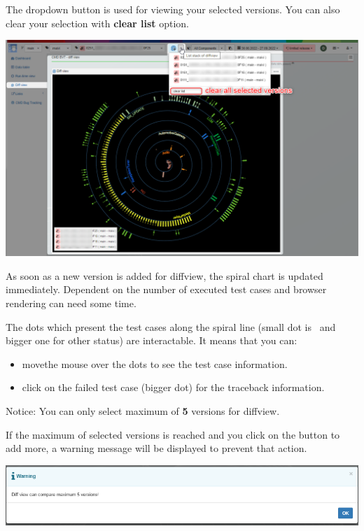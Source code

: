 The dropdown button is used for viewing your selected versions.
You can also clear your selection with \textbf{clear list} option.

\includegraphics[width=1\linewidth]{./pictures/diffview/selected_version.png}

As soon as a new version is added for diffview, the spiral chart is updated
immediately. Dependent on the number of executed test cases and browser
rendering can need some time.

The dots which present the test cases along the spiral line (small dot is
\passed\ and bigger one for other status) are interactable.
It means that you can:
\begin{itemize}
   \item movethe mouse over the dots to see the test case information.
   \item click on the failed test case (bigger dot) for the traceback
         information.
\end{itemize}

\begin{boxhint}{Notice:}
   You can only select maximum of \textbf{5} versions for diffview.

   If the maximum of selected versions is reached and you click on the button to
   add more, a warning message will be displayed to prevent that action.
\end{boxhint}

\includegraphics[width=\linewidth]{./pictures/diffview/warning.png}

